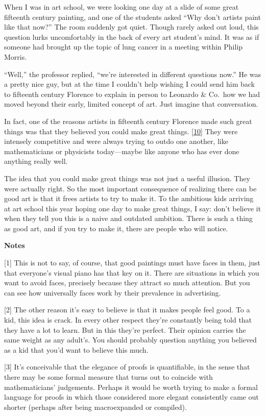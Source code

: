 When I was in art school, we were looking one day at a slide of some
great fifteenth century painting, and one of the students asked ``Why
don't artists paint like that now?'' The room suddenly got quiet. Though
rarely asked out loud, this question lurks uncomfortably in the back of
every art student's mind. It was as if someone had brought up the topic
of lung cancer in a meeting within Philip Morris.

``Well,'' the professor replied, ``we're interested in different
questions now.'' He was a pretty nice guy, but at the time I couldn't
help wishing I could send him back to fifteenth century Florence to
explain in person to Leonardo \& Co.~how we had moved beyond their
early, limited concept of art. Just imagine that conversation.

In fact, one of the reasons artists in fifteenth century Florence made
such great things was that they believed you could make great things.
{[}\hyperref[f10n]{10}{]} They were intensely competitive and were
always trying to outdo one another, like mathematicians or physicists
today---maybe like anyone who has ever done anything really well.

The idea that you could make great things was not just a useful
illusion. They were actually right. So the most important consequence of
realizing there can be good art is that it frees artists to try to make
it. To the ambitious kids arriving at art school this year hoping one
day to make great things, I say: don't believe it when they tell you
this is a naive and outdated ambition. There is such a thing as good
art, and if you try to make it, there are people who will notice.

\textbf{Notes}

{[}1{]} This is not to say, of course, that good paintings must have
faces in them, just that everyone's visual piano has that key on it.
There are situations in which you want to avoid faces, precisely because
they attract so much attention. But you can see how universally faces
work by their prevalence in advertising.

{[}2{]} The other reason it's easy to believe is that it makes people
feel good. To a kid, this idea is crack. In every other respect they're
constantly being told that they have a lot to learn. But in this they're
perfect. Their opinion carries the same weight as any adult's. You
should probably question anything you believed as a kid that you'd want
to believe this much.

{[}3{]} It's conceivable that the elegance of proofs is quantifiable, in
the sense that there may be some formal measure that turns out to
coincide with mathematicians' judgements. Perhaps it would be worth
trying to make a formal language for proofs in which those considered
more elegant consistently came out shorter (perhaps after being
macroexpanded or compiled).

